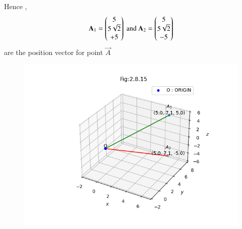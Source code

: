 \documentclass[journal]{IEEEtran}
\numberwithin{equation}{enumi}
\numberwithin{figure}{enumi}
\begin{document}
Hence , 
\begin{align}
    \mathbf{A}_1 = \begin{pmatrix}5 \\ 5\sqrt{2} \\ +5\end{pmatrix} \text{ and } \mathbf{A}_2 = \begin{pmatrix}5 \\ 5\sqrt{2} \\ -5\end{pmatrix} 
\end{align}
are the position vector for point $\vec{A}$



\begin{figure}[H]
    \centering
    \includegraphics[width=1\columnwidth]{figs/vector1.png}
    \caption*{}
    \label{fig:}
\end{figure}
\end{document}
